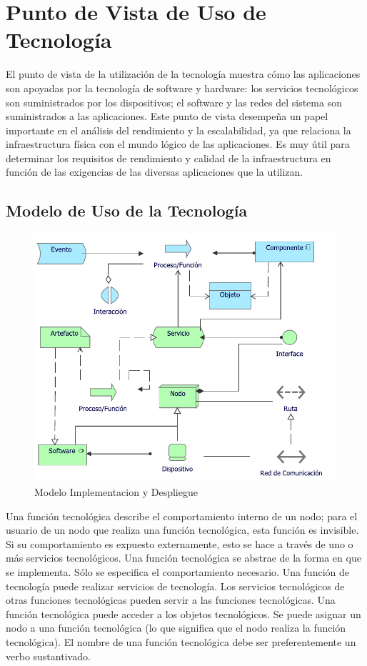 \section{Punto de Vista de Uso de Tecnología}

El punto de vista de la utilización de la tecnología muestra cómo las aplicaciones son apoyadas por la tecnología de software y hardware: los servicios tecnológicos son suministrados por los dispositivos; el software y las redes del sistema son suministrados a las aplicaciones. Este punto de vista desempeña un papel importante en el análisis del rendimiento y la escalabilidad, ya que relaciona la infraestructura física con el mundo lógico de las aplicaciones. Es muy útil para determinar los requisitos de rendimiento y calidad de la infraestructura en función de las exigencias de las diversas aplicaciones que la utilizan.

\subsection{Modelo de Uso de la Tecnología}
\begin{figure}[h!]
	\centering
	\includegraphics[width=.8\linewidth]{imgs/modelo/UsoTecnologia.pdf}
	\caption{Modelo Implementacion y Despliegue}
\end{figure}

Una función tecnológica describe el comportamiento interno de un nodo; para el usuario de un nodo que realiza una función tecnológica, esta función es invisible. Si su comportamiento es expuesto externamente, esto se hace a través de uno o más servicios tecnológicos. Una función tecnológica se abstrae de la forma en que se implementa. Sólo se especifica el comportamiento necesario. Una función de tecnología puede realizar servicios de tecnología. Los servicios tecnológicos de otras funciones tecnológicas pueden servir a las funciones tecnológicas. Una función tecnológica puede acceder a los objetos tecnológicos. Se puede asignar un nodo a una función tecnológica (lo que significa que el nodo realiza la función tecnológica). El nombre de una función tecnológica debe ser preferentemente un verbo sustantivado.

